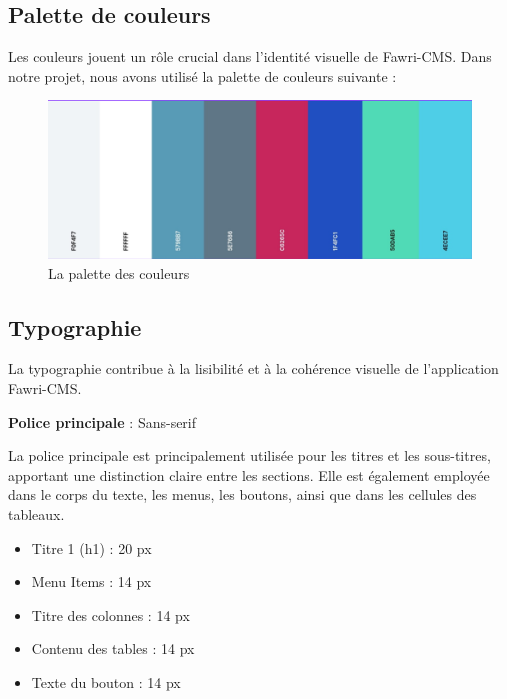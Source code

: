 \subsection{Palette de couleurs}
\hspace{\parindent}Les couleurs jouent un rôle crucial dans l'identité visuelle de Fawri-CMS. Dans notre projet, nous avons utilisé la palette de couleurs suivante :
\\
\begin{figure}[H]
  \centering
  \includegraphics[width=12cm]{Figures/palette.PNG}
  \caption{La palette des couleurs}
\end{figure}



\subsection{Typographie}
\hspace{\parindent}La typographie contribue à la lisibilité et à la cohérence visuelle de l'application Fawri-CMS.

\textbf{Police principale} : Sans-serif

La police principale est principalement utilisée pour les titres et les sous-titres, apportant une distinction claire entre les sections. Elle est également employée dans le corps du texte, les menus, les boutons, ainsi que dans les cellules des tableaux.

\begin{itemize}
  \item Titre 1 (h1) : 20 px

  \item Menu Items : 14 px

  \item Titre des colonnes : 14 px

  \item Contenu des tables : 14 px

  \item Texte du bouton : 14 px
\end{itemize}










